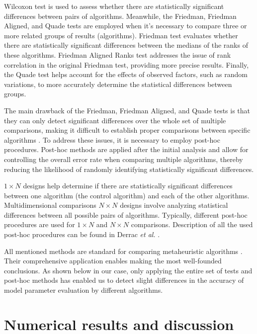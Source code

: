 \documentclass[a4paper,fleqn]{cas-sc}
\begin{document}
Wilcoxon test is used to assess whether there are statistically significant differences between pairs of algorithms.
Meanwhile, the Friedman, Friedman Aligned, and Quade tests are employed when it's necessary to compare three or more related groups of results (algorithms).
Friedman test evaluates whether there are statistically significant differences between the medians of the ranks of these algorithms.
Friedman Aligned Ranks test addresses the issue of rank correlation in the original Friedman test, providing more precise results.
Finally, the Quade test helps account for the effects of observed factors, such as random variations,
to more accurately determine the statistical differences between groups.

The main drawback of the Friedman, Friedman Aligned, and Quade tests is that
they can only detect significant differences over the whole set of multiple comparisons,
making it difficult to establish proper comparisons between specific algorithms \cite{Derrac2011}.
To address these issues, it is necessary to employ post-hoc procedures.
Post-hoc methods are applied after the initial analysis and allow for controlling the overall error rate
when comparing multiple algorithms, thereby reducing the likelihood of randomly identifying statistically significant differences.

$1\times N$ designs help determine if there are statistically significant differences between one algorithm
(the control algorithm) and each of the other algorithms.
Multidimensional comparisons $N\times N$ designs involve analyzing statistical differences between all possible pairs of algorithms.
Typically, different post-hoc procedures are used for $1\times N$ and $N\times N$ comparisons.
Description of all the used post-hoc procedures can be found in Derrac \emph{et al.} \cite{Derrac2011}.

All mentioned methods are standard for comparing metaheuristic algorithms \cite{Derrac2011}.
Their comprehensive application enables making the most well-founded conclusions.
As shown below in our case, only applying the entire set of tests and post-hoc methods 
has enabled us to detect slight differences in the accuracy of model parameter evaluation by different algorithms.



\section{Numerical results and discussion}\label{Result}
\end{document}
